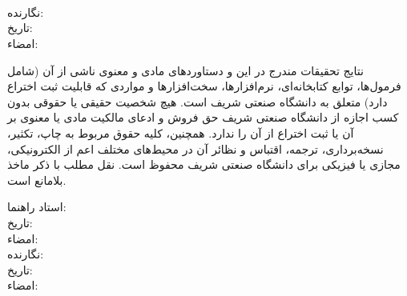 {\begin{multicols}{2}
\ \\
\ \\
\ \\

نگارنده: \ThesisAuthor\\
تاریخ: \\
امضاء: \\
\end{multicols}

نتایج تحقیقات مندرج در این \ThesisType{} و دستاوردهای مادی و معنوی ناشی از آن (شامل فرمول‌ها، توابع کتابخانه‌ای، نرم‌افزارها، سخت‌افزارها و مواردی که قابلیت ثبت اختراع دارد) متعلق به دانشگاه صنعتی شریف است. هیچ شخصیت حقیقی یا حقوقی بدون کسب اجازه از دانشگاه صنعتی شریف حق فروش و ادعای مالکیت مادی یا معنوی بر آن یا ثبت اختراع از آن را ندارد. همچنین، کلیه حقوق مربوط به چاپ، تکثیر، نسخه‌برداری، ترجمه، اقتباس و نظائر آن در محیط‌های مختلف اعم از الکترونیکی، مجازی یا فیزیکی برای دانشگاه صنعتی شریف محفوظ است. نقل مطلب با ذکر ماخذ بلامانع است.


\begin{multicols}{2}
استاد راهنما: \ThesisSupervisor \\
تاریخ: \\
امضاء: \\

نگارنده: \ThesisAuthor\\
تاریخ: \\
امضاء: \\
\end{multicols}
}

